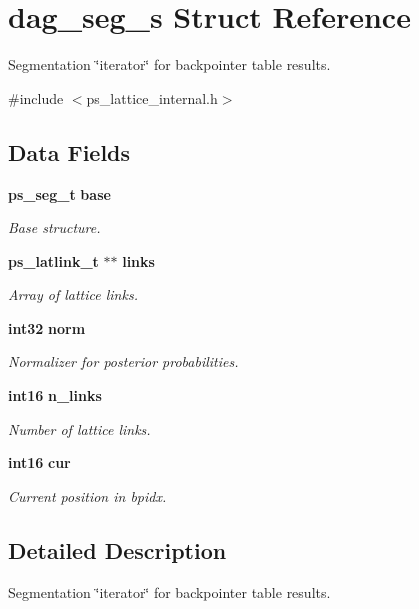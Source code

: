 \section{dag\-\_\-seg\-\_\-s \-Struct \-Reference}
\label{structdag__seg__s}


\-Segmentation \char`\"{}iterator\char`\"{} for backpointer table results.  




{\ttfamily \#include $<$ps\-\_\-lattice\-\_\-internal.\-h$>$}

\subsection*{\-Data \-Fields}
\begin{DoxyCompactItemize}
\item 
{\bf ps\-\_\-seg\-\_\-t} {\bf base}
\begin{DoxyCompactList}\small\item\em \-Base structure. \end{DoxyCompactList}\item 
{\bf ps\-\_\-latlink\-\_\-t} $\ast$$\ast$ {\bf links}
\begin{DoxyCompactList}\small\item\em \-Array of lattice links. \end{DoxyCompactList}\item 
{\bf int32} {\bf norm}
\begin{DoxyCompactList}\small\item\em \-Normalizer for posterior probabilities. \end{DoxyCompactList}\item 
{\bf int16} {\bf n\-\_\-links}
\begin{DoxyCompactList}\small\item\em \-Number of lattice links. \end{DoxyCompactList}\item 
{\bf int16} {\bf cur}
\begin{DoxyCompactList}\small\item\em \-Current position in bpidx. \end{DoxyCompactList}\end{DoxyCompactItemize}


\subsection{\-Detailed \-Description}
\-Segmentation \char`\"{}iterator\char`\"{} for backpointer table results. 

